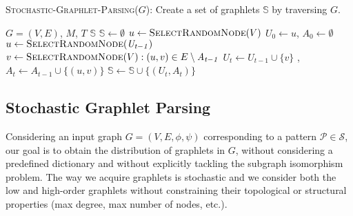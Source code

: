 \documentclass[journal]{IEEEtran}
\theoremstyle{definition}
\begin{document}
\begin{algorithm}
\caption{\textsc{Stochastic-Graphlet-Parsing}($G$): Create a set of graphlets $\mathbb{S}$ by traversing $G$.}
\label{alg:extractgrahletsdfs}
\begin{algorithmic}[1]
\REQUIRE $G=(V,E)$, $\mathit{M}$, $\mathit{T}$
\ENSURE $\mathbb{S}$
\STATE $\mathbb{S}\leftarrow \emptyset$
 \label{alg:extractgrahletsdfs:it1}
\STATE $u \leftarrow \textsc{SelectRandomNode}(V)$ \label{alg:extractgrahletsdfs:ransel1}
\STATE $\mathit{U_0}\leftarrow u$, $\mathit{A_0} \gets \emptyset$ \label{alg:extractgrahletsdfs:init}
 \label{alg:extractgrahletsdfs:it2}
\STATE $u \leftarrow \textsc{SelectRandomNode}(\mathit{U_{t-1}})$ \label{alg:extractgrahletsdfs:ransel2}
\STATE $v \leftarrow \textsc{SelectRandomNode}(V): (u,v)\in E\setminus\mathit{A_{t-1}}$ \label{alg:extractgrahletsdfs:ransel3}
\STATE $U_t \leftarrow U_{t-1} \cup \{v\}$ , \ \ \ $A_t \leftarrow A_{t-1} \cup \{(u,v)\}$ \label{alg:extractgrahletsdfs:updateVN}
\STATE $\mathbb{S} \leftarrow \mathbb{S} \cup\lbrace( U_t, A_t)\rbrace$
\ENDFOR
\ENDFOR
\end{algorithmic}
\end{algorithm}

\subsection{Stochastic Graphlet Parsing}
\label{ssec:higher-order-spatial-feat}

Considering an input graph $G=(V,E,\phi,\psi)$ corresponding to a pattern $\mathcal{P}\in\mathcal{S}$, our goal is to obtain the distribution of graphlets in $G$, without considering a predefined dictionary and without explicitly tackling the subgraph isomorphism problem. The way we acquire graphlets is stochastic and we {consider both the low and high-order graphlets} without constraining their topological or structural properties (max degree, max number of nodes, etc.).
\end{document}

